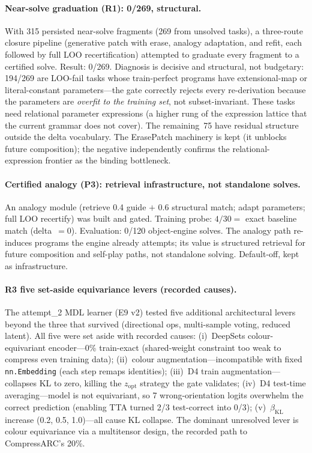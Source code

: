 \documentclass[11pt]{article}
\begin{document}
\paragraph{Near-solve graduation (R1): 0/269, structural.}
With 315 persisted near-solve fragments (269 from unsolved tasks), a
three-route closure pipeline (generative patch with erase, analogy
adaptation, and refit, each followed by full LOO recertification) attempted
to graduate every fragment to a certified solve.  Result: 0/269.
Diagnosis is decisive and structural, not budgetary: 194/269 are LOO-fail
tasks whose train-perfect programs have extensional-map or
literal-constant parameters---the gate correctly rejects every
re-derivation because the parameters are \emph{overfit to the training
set}, not subset-invariant.  These tasks need relational parameter
expressions (a higher rung of the expression lattice that the current
grammar does not cover).  The remaining~75 have residual structure outside
the delta vocabulary.  The ErasePatch machinery is kept (it unblocks future
composition); the negative independently confirms the
relational-expression frontier as the binding bottleneck.

\paragraph{Certified analogy (P3): retrieval infrastructure, not
  standalone solves.}
An analogy module (retrieve 0.4 guide $+$ 0.6 structural match; adapt
parameters; full LOO recertify) was built and gated.  Training probe:
$4/30 =$ exact baseline match (delta~$= 0$).  Evaluation: 0/120
object-engine solves.  The analogy path re-induces programs the engine
already attempts; its value is structured retrieval for future composition
and self-play paths, not standalone solving.  Default-off, kept as
infrastructure.

\paragraph{R3 five set-aside equivariance levers (recorded causes).}
The attempt\_2 MDL learner (E9 v2) tested five additional architectural
levers beyond the three that survived (directional ops, multi-sample
voting, reduced latent).  All five were set aside with recorded causes:
(i)~DeepSets colour-equivariant encoder---0\% train-exact (shared-weight
constraint too weak to compress even training data);
(ii)~colour augmentation---incompatible with fixed \texttt{nn.Embedding}
(each step remaps identities);
(iii)~D4 train augmentation---collapses KL to zero, killing the $z_\text{opt}$
strategy the gate validates;
(iv)~D4 test-time averaging---model is not equivariant, so 7
wrong-orientation logits overwhelm the correct prediction (enabling TTA
turned 2/3 test-correct into 0/3);
(v)~$\beta_\text{KL}$ increase (0.2, 0.5, 1.0)---all cause KL collapse.
The dominant unresolved lever is colour equivariance via a multitensor
design, the recorded path to CompressARC's 20\%.
\end{document}
